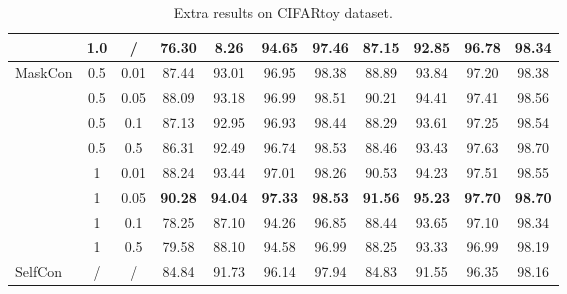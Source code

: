 \documentclass[10pt,twocolumn,letterpaper]{article}
\begin{document}
\begin{table*}[htbp]
\begin{tabular}{@{}l|c|c|cccc|cccc@{}}
                         & 1.0                  & /                       & 76.30          & 8.26           & 94.65          & 97.46          & 87.15          & 92.85          & 96.78          & 98.34          \\ \midrule
\multirow{8}{*}{MaskCon} & 0.5                  & 0.01                    & 87.44          & 93.01          & 96.95          & 98.38          & 88.89          & 93.84          & 97.20          & 98.38          \\
                         & 0.5                  & 0.05                    & 88.09          & 93.18          & 96.99          & 98.51          & 90.21          & 94.41          & 97.41          & 98.56          \\
                         & 0.5                  & 0.1                     & 87.13          & 92.95          & 96.93          & 98.44          & 88.29          & 93.61          & 97.25          & 98.54          \\
                         & 0.5                  & 0.5                     & 86.31          & 92.49          & 96.74          & 98.53          & 88.46          & 93.43          & 97.63          & 98.70          \\
                         & 1                    & 0.01                    & 88.24          & 93.44          & 97.01          & 98.26          & 90.53          & 94.23          & 97.51          & 98.55          \\
                         & 1                    & 0.05                    & \textbf{90.28} & \textbf{94.04} & \textbf{97.33} & \textbf{98.53} & \textbf{91.56} & \textbf{95.23} & \textbf{97.70} & \textbf{98.70} \\
                         & 1                    & 0.1                     & 78.25          & 87.10          & 94.26          & 96.85          & 88.44          & 93.65          & 97.10          & 98.34          \\
                         & 1                    & 0.5                     & 79.58          & 88.10          & 94.58          & 96.99          & 88.25          & 93.33          & 96.99          & 98.19          \\ \midrule
SelfCon                  & /                    & /                       & 84.84          & 91.73          & 96.14          & 97.94          & 84.83          & 91.55          & 96.35          & 98.16          \\ \bottomrule
\end{tabular}
\caption{Extra results on CIFARtoy dataset.}
\label{tab:cifartoy}
\end{table*}
\end{document}
